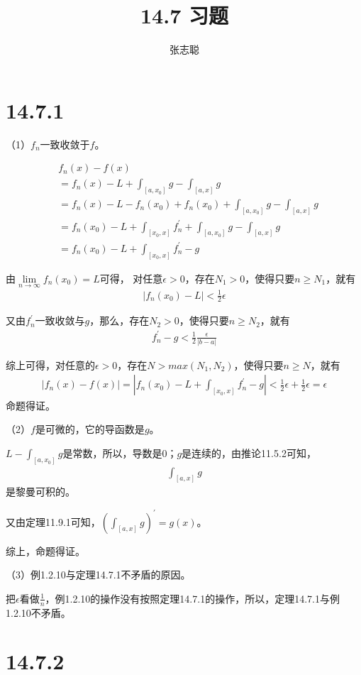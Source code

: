 \documentclass{article}
\begin{document}
\title{14.7 习题}
\author{张志聪}
\maketitle

\section*{14.7.1}
（1）$f_n$一致收敛于$f$。

\begin{align*}
   & f_n(x) - f(x)                                                                     \\
   & = f_n(x) - L + \int_{[a, x_0]} g - \int_{[a, x]} g                                \\
   & = f_n(x) - L - f_n(x_0) + f_n(x_0) + \int_{[a, x_0]} g - \int_{[a, x]} g          \\
   & = f_n(x_0) - L + \int_{[x_0, x]} f^\prime_n + \int_{[a, x_0]} g - \int_{[a, x]} g \\
   & = f_n(x_0) - L + \int_{[x_0, x]} f^\prime_n - g                                   
\end{align*}

由$\lim\limits_{n \to \infty} f_n(x_0) = L$可得，
对任意$\epsilon > 0$，存在$N_1 > 0$，使得只要$n \geq N_1$，就有
\begin{align*}
  |f_n(x_0) - L| < \frac{1}{2}\epsilon
\end{align*}

又由$f_n^\prime$一致收敛与$g$，那么，存在$N_2 > 0$，使得只要$n \geq N_2$，就有
\begin{align*}
  f^\prime_n - g < \frac{1}{2}\frac{\epsilon}{|b - a|}
\end{align*}

综上可得，对任意的$\epsilon > 0$，存在$N > max(N_1, N_2)$，使得只要$n \geq N$，就有
\begin{align*}
  |f_n(x) - f(x)| = |f_n(x_0) - L + \int_{[x_0, x]} f^\prime_n - g| < \frac{1}{2}\epsilon + \frac{1}{2}\epsilon = \epsilon
\end{align*}
命题得证。

（2）$f$是可微的，它的导函数是$g$。

$L - \int_{[a, x_0]} g$是常数，所以，导数是$0$；$g$是连续的，由推论11.5.2可知，
\begin{align*}
  \int_{[a, x]} g
\end{align*}
是黎曼可积的。

又由定理11.9.1可知，$(\int_{[a, x]} g)^\prime = g(x)$。

综上，命题得证。

（3）例1.2.10与定理14.7.1不矛盾的原因。

把$\epsilon$看做$\frac{1}{n}$，例1.2.10的操作没有按照定理14.7.1的操作，所以，定理14.7.1与例1.2.10不矛盾。

\section*{14.7.2}
\end{document}
